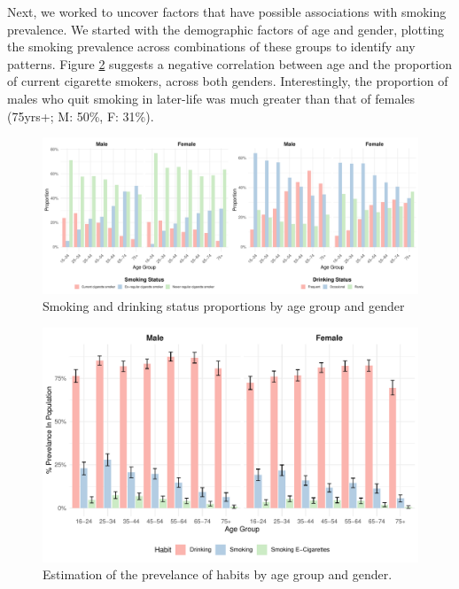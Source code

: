 \documentclass[
  11pt,
  twocolumn]{article}
\begin{document}
Next, we worked to uncover factors that have possible associations with
smoking prevalence. We started with the demographic factors of age and
gender, plotting the smoking prevalence across combinations of these
groups to identify any patterns. Figure \ref{fig:output-prevelance-plot}
suggests a negative correlation between age and the proportion of
current cigarette smokers, across both genders. Interestingly, the
proportion of males who quit smoking in later-life was much greater than
that of females (75yrs+; M: 50\%, F: 31\%).

\begin{figure}[H]
\includegraphics{Coursework_files/figure-latex/output-smoking-drinking-age-plot-1} \caption{Smoking and drinking status proportions by age group and gender}\label{fig:output-smoking-drinking-age-plot}
\end{figure}

\begin{figure}[H]
\includegraphics{Coursework_files/figure-latex/output-prevelance-plot-1} \caption{Estimation of the prevelance of habits by age group and gender.}\label{fig:output-prevelance-plot}
\end{figure}
\end{document}
